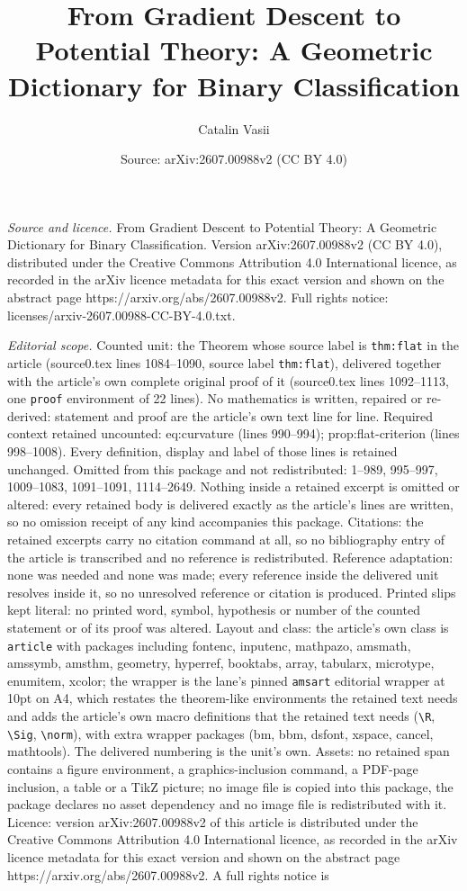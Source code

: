\documentclass[10pt,a4paper]{amsart}
\title[From Gradient Descent to Potential Theory: A Geometric Dicti]{From Gradient Descent to Potential Theory: A Geometric Dictionary for Binary Classification}
\author{Catalin Vasii}
\date{Source: arXiv:2607.00988v2 (CC BY 4.0)}
\begin{document}
\maketitle

\noindent\emph{Source and licence.} From Gradient Descent to Potential Theory: A Geometric Dictionary for Binary Classification. Version arXiv:2607.00988v2 (CC BY 4.0), distributed under the Creative Commons Attribution 4.0 International licence, as recorded in the arXiv licence metadata for this exact version and shown on the abstract page https://arxiv.org/abs/2607.00988v2. Full rights notice: licenses/arxiv-2607.00988-CC-BY-4.0.txt.\par\smallskip

\noindent\textit{Editorial scope.} Counted unit: the Theorem whose source label is \texttt{thm:flat} in the article (source0.tex lines 1084--1090, source label \texttt{thm:flat}), delivered together with the article's own complete original proof of it (source0.tex lines 1092--1113, one \texttt{proof} environment of 22 lines). No mathematics is written, repaired or re-derived: statement and proof are the article's own text line for line. Required context retained uncounted: eq:curvature (lines 990--994); prop:flat-criterion (lines 998--1008). Every definition, display and label of those lines is retained unchanged. Omitted from this package and not redistributed: 1--989, 995--997, 1009--1083, 1091--1091, 1114--2649. Nothing inside a retained excerpt is omitted or altered: every retained body is delivered exactly as the article's lines are written, so no omission receipt of any kind accompanies this package. Citations: the retained excerpts carry no citation command at all, so no bibliography entry of the article is transcribed and no reference is redistributed. Reference adaptation: none was needed and none was made; every reference inside the delivered unit resolves inside it, so no unresolved reference or citation is produced. Printed slips kept literal: no printed word, symbol, hypothesis or number of the counted statement or of its proof was altered. Layout and class: the article's own class is \texttt{article} with packages including fontenc, inputenc, mathpazo, amsmath, amssymb, amsthm, geometry, hyperref, booktabs, array, tabularx, microtype, enumitem, xcolor; the wrapper is the lane's pinned \texttt{amsart} editorial wrapper at 10pt on A4, which restates the theorem-like environments the retained text needs and adds the article's own macro definitions that the retained text needs (\texttt{\textbackslash R}, \texttt{\textbackslash Sig}, \texttt{\textbackslash norm}), with extra wrapper packages (bm, bbm, dsfont, xspace, cancel, mathtools). The delivered numbering is the unit's own. Assets: no retained span contains a figure environment, a graphics-inclusion command, a PDF-page inclusion, a table or a TikZ picture; no image file is copied into this package, the package declares no asset dependency and no image file is redistributed with it. Licence: version arXiv:2607.00988v2 of this article is distributed under the Creative Commons Attribution 4.0 International licence, as recorded in the arXiv licence metadata for this exact version and shown on the abstract page https://arxiv.org/abs/2607.00988v2. A full rights notice is 
\end{document}
